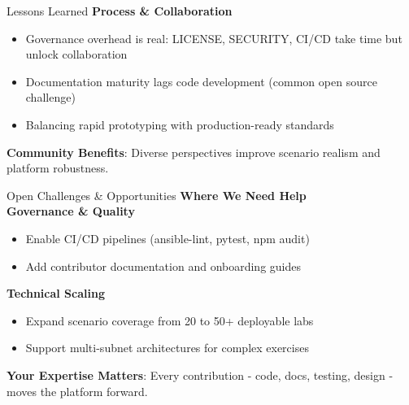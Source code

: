 \documentclass[aspectratio=169]{beamer}
\begin{document}
\begin{frame}{Lessons Learned \; \faLightbulb}
  \textbf{Process \& Collaboration}
  \begin{itemize}
    \item \alert{Governance overhead is real}: LICENSE, SECURITY, CI/CD take time but unlock collaboration
    \item Documentation maturity lags code development (common open source challenge)
    \item Balancing rapid prototyping with production-ready standards
  \end{itemize}
  \vspace{2mm}
  \begin{tcolorbox}
    \faHandshake\; \textbf{Community Benefits}: Diverse perspectives improve scenario realism and platform robustness.
  \end{tcolorbox}
\end{frame}

\begin{frame}{Open Challenges \& Opportunities \; \faExclamationTriangle}
  \textbf{Where We Need Help}\\[3mm]
  
  \textbf{Governance \& Quality}
  \begin{itemize}
    \item Enable CI/CD pipelines (ansible-lint, pytest, npm audit)
    \item Add contributor documentation and onboarding guides
  \end{itemize}
  
  \textbf{Technical Scaling}
  \begin{itemize}
    \item Expand scenario coverage from 20 to 50+ deployable labs
    \item Support multi-subnet architectures for complex exercises
  \end{itemize}
  \vspace{2mm}
  \begin{tcolorbox}
    \faUsers\; \textbf{Your Expertise Matters}: Every contribution - code, docs, testing, design - moves the platform forward.
  \end{tcolorbox}
\end{frame}
\end{document}
